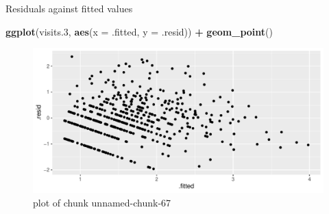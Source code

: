 \documentclass[ignorenonframetext,]{beamer}
\newenvironment{Shaded}{\begin{snugshade}}{\end{snugshade}}
\newcommand{\DataTypeTok}[1]{\textcolor[rgb]{0.13,0.29,0.53}{#1}}
\newcommand{\FloatTok}[1]{\textcolor[rgb]{0.00,0.00,0.81}{#1}}
\newcommand{\KeywordTok}[1]{\textcolor[rgb]{0.13,0.29,0.53}{\textbf{#1}}}
\newcommand{\NormalTok}[1]{#1}
\newcommand{\OperatorTok}[1]{\textcolor[rgb]{0.81,0.36,0.00}{\textbf{#1}}}
\newcommand{\StringTok}[1]{\textcolor[rgb]{0.31,0.60,0.02}{#1}}
\begin{document}
\begin{frame}[fragile]{Residuals against fitted values}
\protect\hypertarget{residuals-against-fitted-values}{}

\begin{Shaded}
\begin{Highlighting}[]
\KeywordTok{ggplot}\NormalTok{(visits}\FloatTok{.3}\NormalTok{, }\KeywordTok{aes}\NormalTok{(}\DataTypeTok{x =}\NormalTok{ .fitted, }\DataTypeTok{y =}\NormalTok{ .resid)) }\OperatorTok{+}
\StringTok{  }\KeywordTok{geom_point}\NormalTok{()}
\end{Highlighting}
\end{Shaded}

\begin{figure}
\centering
\includegraphics{figure/unnamed-chunk-67-1.pdf}
\caption{plot of chunk unnamed-chunk-67}
\end{figure}

\end{frame}
\end{document}
